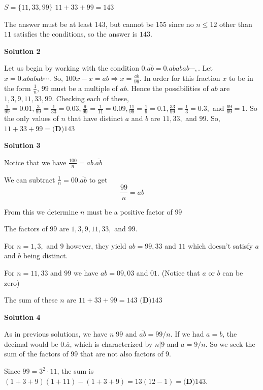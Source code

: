 \begin{enumerate}
 $S = \{11, 33, 99\}$
$11 + 33 + 99 = 143$

 The answer must be at least $143$, but cannot be $155$ since no $n \le 12$ other than $11$ satisfies the conditions, so the answer is $143$.

 



\textbf{Solution 2}

Let us begin by working with the condition $0.\overline{ab} = 0.ababab\cdots,$. Let $x = 0.ababab\cdots$. So, $100x-x = ab \Rightarrow x = \frac{ab}{99}$. In order for this fraction $x$ to be in the form $\frac{1}{n}$, $99$ must be a multiple of $ab$. Hence the possibilities of $ab$ are $1,3,9,11,33,99$. Checking each of these, $\frac{1}{99} = 0.\overline{01}, \frac{3}{99}=\frac{1}{33} = 0.\overline{03}, \frac{9}{99}=\frac{1}{11} = 0.\overline{09}, \frac{11}{99}=\frac{1}{9} = 0.\overline{1}, \frac{33}{99} =\frac{1}{3}= 0.\overline{3},$ and $\frac{99}{99} = 1$. So the only values of $n$ that have distinct $a$ and $b$ are $11,33,$ and $99$. So, $11+33+99= \boxed{\textbf{(D)} 143}$




\textbf{Solution 3}

Notice that we have $\frac{100}{n}= ab.\overline{ab}$ 

 We can subtract $\frac{1}{n}=00.\overline{ab}$ to get 
 \[\frac{99}{n}=ab\]

 From this we determine $n$ must be a positive factor of $99$

 
The factors of $99$ are $1,3,9,11,33,$ and $99$.

 For $n=1,3,$ and $9$ however, they yield $ab=99,33$ and $11$ which doesn't satisfy $a$ and $b$ being distinct. 

 For $n=11,33$ and $99$ we have $ab=09,03$ and $01$.  (Notice that $a$ or $b$ can be zero)

 The sum of these $n$ are $11+33+99=143$
$\boxed{\textbf{(D)} 143}$




\textbf{Solution 4}

As in previous solutions, we have $n|99$ and $\overline{ab} = 99/n$. If we had $a=b$, the decimal would be $0.\overline{a}$, which is characterized by $n|9$ and $a = 9/n$. So we seek the sum of the factors of 99 that are not also factors of 9.

 Since $99 = 3^2 \cdot 11$, the sum is $(1 + 3 + 9)(1 + 11) - (1 + 3 + 9) = 13(12 - 1) = \textbf{(D)} 143$.

 



\end{enumerate}
